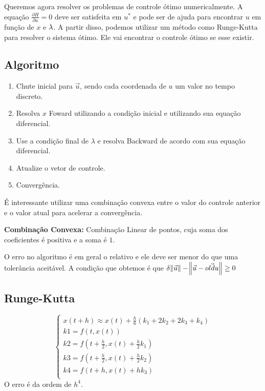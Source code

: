 Queremos agora resolver os problemas de controle ótimo numericalmente. A equação $\frac{\partial H}{\partial u} = 0$ deve ser satisfeita em $u^*$ e pode ser de ajuda para encontrar $u$ em função de $x$ e $\lambda$. A partir disso, podemos utilizar um método como Runge-Kutta para resolver o sistema ótimo. Ele vai encontrar o controle ótimo se esse existir. 
\subsection{Algoritmo}
\begin{enumerate}
    \item Chute inicial para $\Vec{u}$, sendo cada coordenada de $u$ um valor no tempo discreto. 
    \item Resolva $x$ Foward utilizando a condição inicial e utilizando sua equação diferencial.
    \item Use a condição final de $\lambda$ e resolva Backward de acordo com sua equação diferencial.
    \item Atualize o vetor de controle. 
    \item Convergência. 
\end{enumerate}

É interessante utilizar uma combinação convexa entre o valor do controle anterior e o valor atual para acelerar a convergência.

\textbf{Combinação Convexa:}    Combinação Linear de pontos, cuja soma dos coeficientes é positiva e a soma é $1$.  

O erro no algoritmo é em geral o relativo e ele deve ser menor do que uma tolerância aceitável. A condição que obtemos é que $\delta \norm{\Vec{u}} - \norm{\Vec{u} - \Vec{oldu}} \geq 0$

\subsection{Runge-Kutta}
\begin{equation*}
    \begin{cases}
    x(t + h) \approx x(t) + \frac{h}{6}(k_1 + 2k_2 + 2k_3 + k_4) \\
    k1 = f(t,x(t)) \\
    k2 = f(t + \frac{h}{2},x(t) + \frac{h}{2}k_1) \\
    k3 = f(t + \frac{h}{2},x(t) + \frac{h}{2}k_2) \\
    k4 = f(t + h, x(t) + hk_3) \\
    \end{cases}
\end{equation*}
O erro é da ordem de $h^4$. 